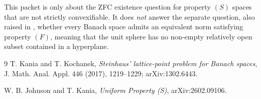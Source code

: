 \documentclass[11pt]{article}
\begin{document}
This packet is only about the ZFC existence question for property \((S)\)
spaces that are not strictly convexifiable.  It does \emph{not} answer the
separate question, also raised in \cite{KK}, whether every Banach space admits
an equivalent norm satisfying property \((F)\), meaning that the unit sphere
has no non-empty relatively open subset contained in a hyperplane.

\begin{thebibliography}{9}
T. Kania and T. Kochanek,
\emph{Steinhaus' lattice-point problem for Banach spaces},
J. Math. Anal. Appl. 446 (2017), 1219--1229;
arXiv:1302.6443.

W. B. Johnson and T. Kania,
\emph{Uniform Property (S)},
arXiv:2602.09106.
\end{thebibliography}
\end{document}
